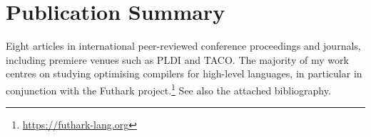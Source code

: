 \documentclass{resume} %
\begin{document}
\section{Publication Summary}

Eight articles in international peer-reviewed conference proceedings
and journals, including premiere venues such as PLDI and TACO.  The
majority of my work centres on studying optimising compilers for
high-level languages, in particular in conjunction with the Futhark
project.\footnote{\url{https://futhark-lang.org}} See also the
attached bibliography.
\end{document}
